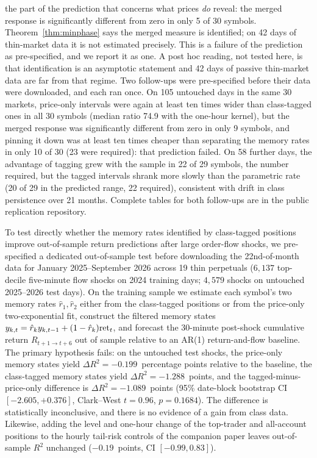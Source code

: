 the part of the prediction that concerns what prices \emph{do} reveal: the merged response is significantly different from zero in only 5 of 30 symbols. Theorem~\ref{thm:minphase} says the merged measure is identified; on 42 days of thin-market data it is not estimated precisely. This is a failure of the prediction as pre-specified, and we report it as one. A post hoc reading, not tested here, is that identification is an asymptotic statement and 42 days of passive thin-market data are far from that regime. Two follow-ups were pre-specified before their data were downloaded, and each ran once. On 105 untouched days in the same 30 markets, price-only intervals were again at least ten times wider than class-tagged ones in all 30 symbols (median ratio 74.9 with the one-hour kernel), but the merged response was significantly different from zero in only 9 symbols, and pinning it down was at least ten times cheaper than separating the memory rates in only 10 of 30 (23 were required): that prediction failed. On 58 further days, the advantage of tagging grew with the sample in 22 of 29 symbols, the number required, but the tagged intervals shrank more slowly than the parametric rate (20 of 29 in the predicted range, 22 required), consistent with drift in class persistence over 21 months. Complete tables for both follow-ups are in the public replication repository.

To test directly whether the memory rates identified by class-tagged positions improve out-of-sample return predictions after large order-flow shocks, we pre-specified a dedicated out-of-sample test before downloading the 22nd-of-month data for January 2025--September 2026 across 19 thin perpetuals ($6{,}137$ top-decile five-minute flow shocks on 2024 training days; $4{,}579$ shocks on untouched 2025--2026 test days). On the training sample we estimate each symbol's two memory rates $\hat r_1,\hat r_2$ either from the class-tagged positions or from the price-only two-exponential fit, construct the filtered memory states $y_{k,t}=\hat r_k y_{k,t-1}+(1-\hat r_k){\rm ret}_t$, and forecast the 30-minute post-shock cumulative return $R_{t+1\to t+6}$ out of sample relative to an AR(1) return-and-flow baseline. The primary hypothesis fails: on the untouched test shocks, the price-only memory states yield $\Delta R^2=-0.199$~percentage points relative to the baseline, the class-tagged memory states yield $\Delta R^2=-1.288$~points, and the tagged-minus-price-only difference is $\Delta R^2=-1.089$~points (95\% date-block bootstrap CI $[-2.605,+0.376]$, Clark--West $t=0.96$, $p=0.1684$). The difference is statistically inconclusive, and there is no evidence of a gain from class data. Likewise, adding the level and one-hour change of the top-trader and all-account positions to the hourly tail-risk controls of the companion paper leaves out-of-sample $R^2$ unchanged ($-0.19$~points, CI $[-0.99,0.83]$).

